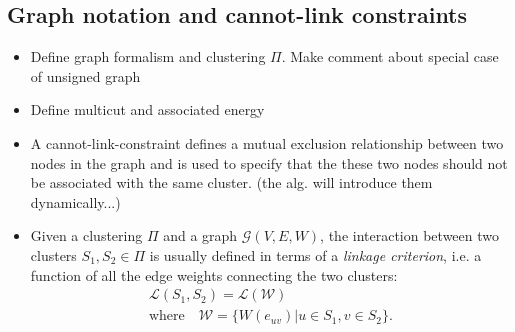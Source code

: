 \subsection{Graph notation and cannot-link constraints}

\begin{itemize}
\item Define graph formalism and clustering $\Pi$. Make comment about special case of unsigned graph
\item Define multicut and associated energy
\item A cannot-link-constraint defines a mutual exclusion relationship between two nodes in the graph and is used to specify that the these two nodes should not be associated with the same cluster. (the alg. will introduce them dynamically...)
\item Given a clustering $\Pi$ and a graph $\mathcal{G}(V,E,W)$, the interaction between two clusters $S_1, S_2 \in \Pi$ is usually defined in terms of a \emph{linkage criterion}, i.e. a function of all the edge weights connecting the two clusters:
\begin{equation} \label{eq:linkage_criterion_def}
\begin{gathered}
\mathcal{L}(S_1,S_2) = \mathcal{L}(\mathcal{W})\quad \\
   \text{where} \quad \mathcal{W} = \{ W(e_{uv})| u\in S_1, v\in S_2 \}.
\end{gathered}
\end{equation}

\end{itemize}


